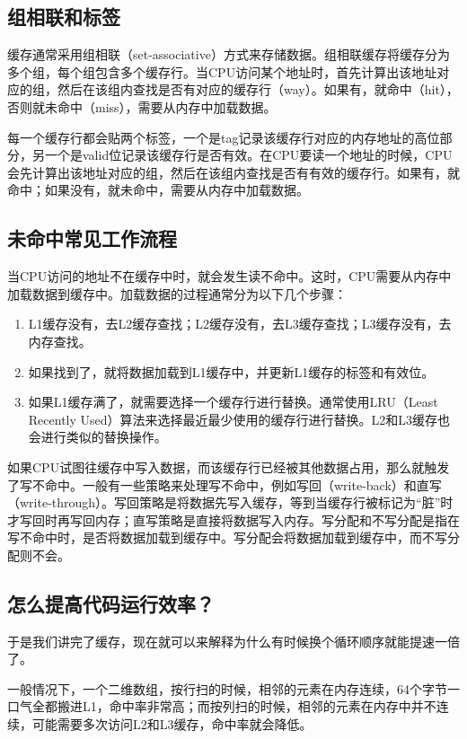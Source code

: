 \documentclass[../main.tex]{subfiles}
\begin{document}
\subsection{组相联和标签}

缓存通常采用组相联（set-associative）方式来存储数据。组相联缓存将缓存分为多个组，每个组包含多个缓存行。当CPU访问某个地址时，首先计算出该地址对应的组，然后在该组内查找是否有对应的缓存行（way）。如果有，就命中（hit），否则就未命中（miss），需要从内存中加载数据。

每一个缓存行都会贴两个标签，一个是tag记录该缓存行对应的内存地址的高位部分，另一个是valid位记录该缓存行是否有效。在CPU要读一个地址的时候，CPU会先计算出该地址对应的组，然后在该组内查找是否有有效的缓存行。如果有，就命中；如果没有，就未命中，需要从内存中加载数据。

\subsection{未命中常见工作流程}

当CPU访问的地址不在缓存中时，就会发生读不命中。这时，CPU需要从内存中加载数据到缓存中。加载数据的过程通常分为以下几个步骤：
\begin{enumerate}
  \item L1缓存没有，去L2缓存查找；L2缓存没有，去L3缓存查找；L3缓存没有，去内存查找。
  \item 如果找到了，就将数据加载到L1缓存中，并更新L1缓存的标签和有效位。
  \item 如果L1缓存满了，就需要选择一个缓存行进行替换。通常使用LRU（Least Recently Used）算法来选择最近最少使用的缓存行进行替换。L2和L3缓存也会进行类似的替换操作。
\end{enumerate}

如果CPU试图往缓存中写入数据，而该缓存行已经被其他数据占用，那么就触发了写不命中。一般有一些策略来处理写不命中，例如写回（write-back）和直写（write-through）。写回策略是将数据先写入缓存，等到当缓存行被标记为“脏”时才写回时再写回内存；直写策略是直接将数据写入内存。写分配和不写分配是指在写不命中时，是否将数据加载到缓存中。写分配会将数据加载到缓存中，而不写分配则不会。

\subsection{怎么提高代码运行效率？}
于是我们讲完了缓存，现在就可以来解释为什么有时候换个循环顺序就能提速一倍了。

一般情况下，一个二维数组，按行扫的时候，相邻的元素在内存连续，64个字节一口气全都搬进L1，命中率非常高；而按列扫的时候，相邻的元素在内存中并不连续，可能需要多次访问L2和L3缓存，命中率就会降低。
\end{document}
